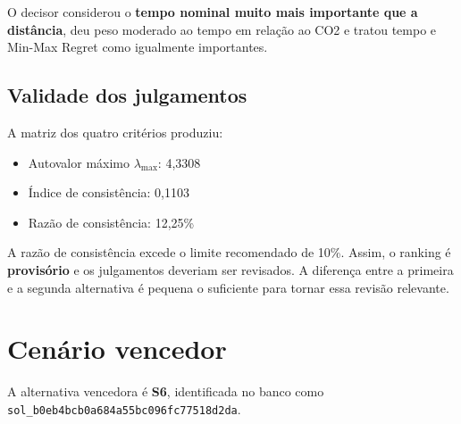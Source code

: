 \documentclass[12pt,a4paper]{article}
\begin{document}
O decisor considerou o \textbf{tempo nominal muito mais importante que a distância},
deu peso moderado ao tempo em relação ao CO2 e tratou tempo e Min-Max Regret como
igualmente importantes.

\subsection{Validade dos julgamentos}

A matriz dos quatro critérios produziu:

\begin{itemize}[leftmargin=*]
  \item Autovalor máximo $\lambda_{\max}$: 4,3308
  \item Índice de consistência: 0,1103
  \item Razão de consistência: 12,25\%
\end{itemize}

A razão de consistência excede o limite recomendado de 10\%. Assim, o ranking é
\textbf{provisório} e os julgamentos deveriam ser revisados. A diferença entre a
primeira e a segunda alternativa é pequena o suficiente para tornar essa revisão relevante.

\section{Cenário vencedor}

A alternativa vencedora é \textbf{S6}, identificada no banco como
\texttt{sol\_b0eb4bcb0a684a55bc096fc77518d2da}.
\end{document}
